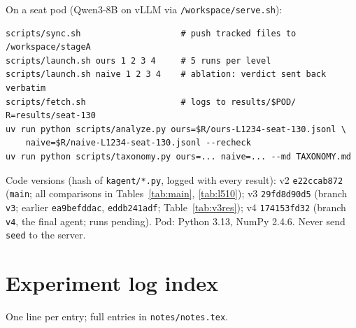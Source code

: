 \documentclass[11pt]{article}
\newcommand{\code}[1]{\texttt{#1}}
\begin{document}
\noindent On a seat pod (Qwen3-8B on vLLM via \code{/workspace/serve.sh}):

\begin{small}
\begin{verbatim}
scripts/sync.sh                    # push tracked files to /workspace/stageA
scripts/launch.sh ours 1 2 3 4     # 5 runs per level
scripts/launch.sh naive 1 2 3 4    # ablation: verdict sent back verbatim
scripts/fetch.sh                   # logs to results/$POD/
R=results/seat-130
uv run python scripts/analyze.py ours=$R/ours-L1234-seat-130.jsonl \
    naive=$R/naive-L1234-seat-130.jsonl --recheck
uv run python scripts/taxonomy.py ours=... naive=... --md TAXONOMY.md
\end{verbatim}
\end{small}

\noindent Code versions (hash of \code{kagent/*.py}, logged with every result): v2 \code{e22ccab872}
(\code{main}; all comparisons in Tables~\ref{tab:main}, \ref{tab:l510}); v3 \code{29fd8d90d5} (branch
\code{v3}; earlier \code{ea9befddac}, \code{eddb241adf}; Table~\ref{tab:v3res}); v4 \code{174153fd32} (branch
\code{v4}, the final agent; runs pending). Pod: Python 3.13, NumPy 2.4.6. Never send
\code{seed} to the server.

\clearpage
\appendix
\section{Experiment log index}
One line per entry; full entries in \code{notes/notes.tex}.
\end{document}
